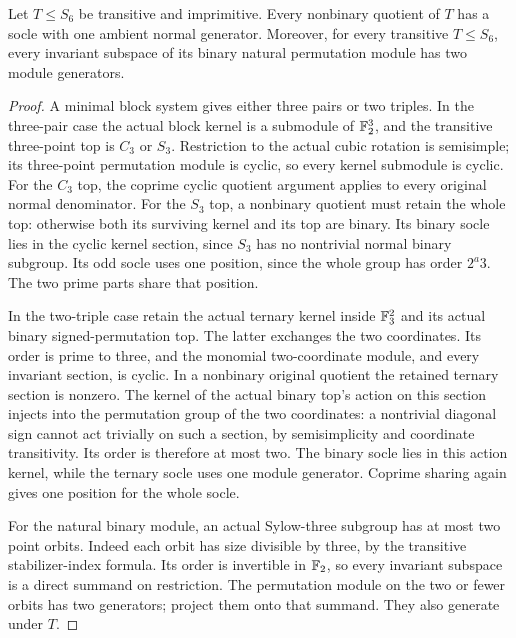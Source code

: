\begin{lemma}\label{lem:six-point-nonbinary-socles}
Let $T\leq S_6$ be transitive and imprimitive. Every nonbinary
quotient of $T$ has a socle with one ambient normal generator.
Moreover, for every transitive $T\leq S_6$, every invariant subspace
of its binary natural permutation module has two module generators.
\end{lemma}
\begin{proof}
A minimal block system gives either three pairs or two triples.
In the three-pair case the actual block kernel is a submodule of
$\mathbb F_2^3$, and the transitive three-point top is $C_3$ or $S_3$.
Restriction to the actual cubic rotation is semisimple; its three-point
permutation module is cyclic, so every kernel submodule is cyclic.
For the $C_3$ top, the coprime cyclic quotient argument applies to every
original normal denominator. For the $S_3$ top, a nonbinary quotient
must retain the whole top: otherwise both its surviving kernel and its
top are binary. Its binary socle lies in the cyclic kernel section,
since $S_3$ has no nontrivial normal binary subgroup. Its odd socle
uses one position, since the whole group has order $2^a3$.
The two prime parts share that position.

In the two-triple case retain the actual ternary kernel inside
$\mathbb F_3^2$ and its actual binary signed-permutation top.
The latter exchanges the two coordinates. Its order is prime to three,
and the monomial two-coordinate module, and every invariant section,
is cyclic. In a nonbinary original quotient the retained ternary
section is nonzero. The kernel of the actual binary top's action on
this section injects into the permutation group of the two coordinates:
a nontrivial diagonal sign cannot act trivially on such a section,
by semisimplicity and coordinate transitivity. Its order is therefore
at most two. The binary socle lies in this action kernel, while the
ternary socle uses one module generator. Coprime sharing again gives
one position for the whole socle.

For the natural binary module, an actual Sylow-three subgroup has at
most two point orbits. Indeed each orbit has size divisible by three,
by the transitive stabilizer-index formula. Its order is invertible in
$\mathbb F_2$, so every invariant subspace is a direct summand on restriction.
The permutation module on the two or fewer orbits has two generators;
project them onto that summand. They also generate under $T$.
\end{proof}

